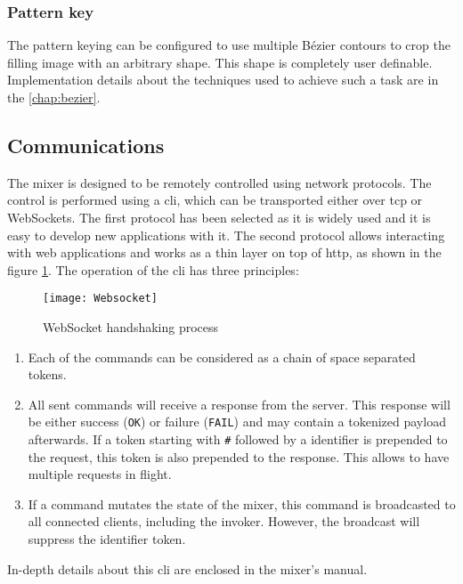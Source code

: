 \documentclass[../main.tex]{subfiles}
\begin{document}
\subsubsection{Pattern key}
The pattern keying can be configured to use multiple Bézier contours to crop the filling image with an arbitrary shape. This shape is completely user definable. Implementation details about the techniques used to achieve such a task are in the \autoref{chap:bezier}.\newline


\subsection{Communications}
The mixer is designed to be remotely controlled using network protocols. The control is performed using a \gls{cli}, which can be transported either over \gls{tcp} or WebSockets. The first protocol has been selected as it is widely used and it is easy to develop new applications with it. The second protocol allows interacting with web applications and works as a thin layer on top of \gls{http}, as shown in the figure \ref{fig:04:websocket}. The operation of the \gls{cli} has three principles:

\begin{figure}[htbp]
    \centering
    \texttt{[image: Websocket]}

    \caption{WebSocket handshaking process}
    \label{fig:04:websocket}
\end{figure}

\begin{enumerate}
    \item Each of the commands can be considered as a chain of space separated tokens.
    \item All sent commands will receive a response from the server. This response will be either success (\texttt{OK}) or failure (\texttt{FAIL}) and may contain a tokenized payload afterwards. If a token starting with \texttt{\#} followed by a identifier is prepended to the request, this token is also prepended to the response. This allows to have multiple requests in flight.
    \item If a command mutates the state of the mixer, this command is broadcasted to all connected clients, including the invoker. However, the broadcast will suppress the identifier token.
\end{enumerate}

In-depth details about this \gls{cli} are enclosed in the mixer's manual.\newline
\end{document}
